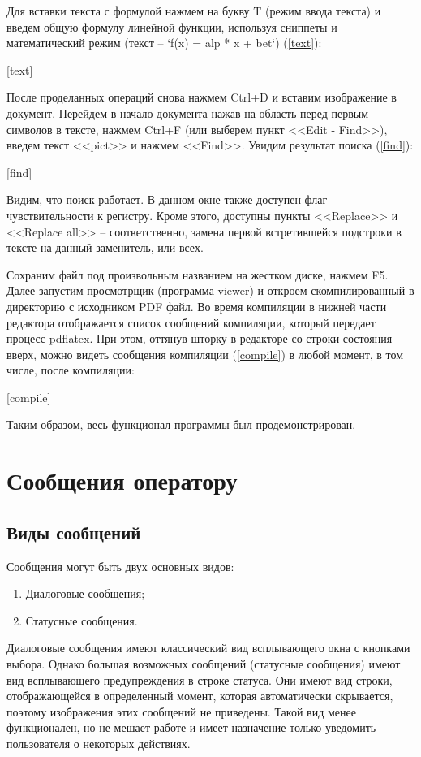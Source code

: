 \documentclass[opermanual]{espd}
\begin{document}
Для вставки текста с формулой нажмем на букву T (режим ввода текста) и введем общую формулу линейной функции, используя сниппеты и математический режим (текст -- `f(x) = alp * x + bet`) (\ref{text}):

[text]

После проделанных операций снова нажмем Ctrl+D и вставим изображение в документ. Перейдем в начало документа нажав на область перед первым символов в тексте, нажмем Ctrl+F (или выберем пункт <<Edit - Find>>), введем текст <<pict>> и нажмем <<Find>>. Увидим результат поиска (\ref{find}):

[find]

Видим, что поиск работает. В данном окне также доступен флаг чувствительности к регистру. Кроме этого, доступны пункты <<Replace>> и <<Replace all>> -- соответственно, замена первой встретившейся подстроки в тексте на данный заменитель, или всех.

Сохраним файл под произвольным названием на жестком диске, нажмем F5. Далее запустим просмотрщик (программа viewer) и откроем скомпилированный в директорию с исходником PDF файл. Во время компиляции в нижней части редактора отображается список сообщений компиляции, который передает процесс pdflatex. При этом, оттянув шторку в редакторе со строки состояния вверх, можно видеть сообщения компиляции (\ref{compile}) в любой момент, в том числе, после компиляции:

[compile]

Таким образом, весь функционал программы был продемонстрирован.

\section{Сообщения оператору}
\subsection{Виды сообщений}
Сообщения могут быть двух основных видов:
\begin{enumerate}
\item Диалоговые сообщения;
\item Статусные сообщения.
\end{enumerate}

Диалоговые сообщения имеют классический вид всплывающего окна с кнопками выбора. Однако большая возможных сообщений (статусные сообщения) имеют вид всплывающего предупреждения в строке статуса. Они имеют вид строки, отображающейся в определенный момент, которая автоматически скрывается, поэтому изображения этих сообщений не приведены. Такой вид менее функционален, но не мешает работе и имеет назначение только уведомить пользователя о некоторых действиях.
\end{document}
